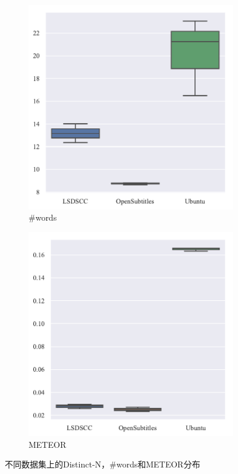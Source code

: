 \begin{figure}[H]
    \begin{subfigure}{0.5\linewidth}
        \centering
        \includegraphics[width=0.8\linewidth]{figure/boxplot/dataset/utterance_len/plot.pdf}
        \caption{\#words}
        \label{fig:words_dataset}
    \end{subfigure}%
    \begin{subfigure}{0.5\linewidth}
        \centering
        \includegraphics[width=0.8\linewidth]{figure/boxplot/dataset/meteor/plot.pdf}
        \caption{METEOR}
        \label{fig:meteor_dataset}
    \end{subfigure}
    \caption{不同数据集上的Distinct-N，\#words和METEOR分布}
    \label{fig:Other_dataset}
\end{figure}
